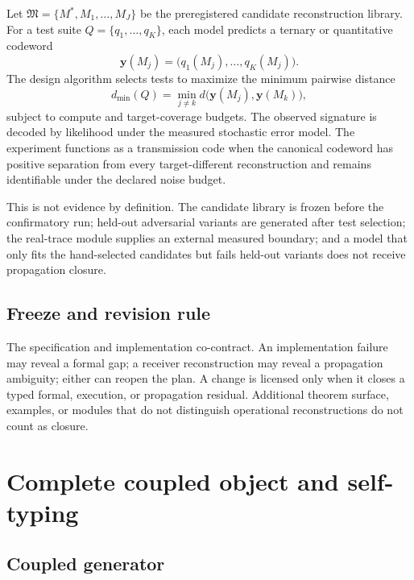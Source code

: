 \documentclass[11pt]{article}
\newcommand{\Codeword}{\mathbf y}
\begin{document}
Let $\mathfrak M=\{M^{\ast},M_1,\ldots,M_J\}$ be the preregistered candidate reconstruction library. For a test suite $Q=\{q_1,\ldots,q_K\}$, each model predicts a ternary or quantitative codeword
\begin{equation}
\Codeword(M_j)=\bigl(q_1(M_j),\ldots,q_K(M_j)\bigr).
\end{equation}
The design algorithm selects tests to maximize the minimum pairwise distance
\begin{equation}
d_{\min}(Q)=\min_{j\ne k}d\bigl(\Codeword(M_j),\Codeword(M_k)\bigr),
\end{equation}
subject to compute and target-coverage budgets. The observed signature is decoded by likelihood under the measured stochastic error model. The experiment functions as a transmission code when the canonical codeword has positive separation from every target-different reconstruction and remains identifiable under the declared noise budget.

This is not evidence by definition. The candidate library is frozen before the confirmatory run; held-out adversarial variants are generated after test selection; the real-trace module supplies an external measured boundary; and a model that only fits the hand-selected candidates but fails held-out variants does not receive propagation closure.

\subsection{Freeze and revision rule}

The specification and implementation co-contract. An implementation failure may reveal a formal gap; a receiver reconstruction may reveal a propagation ambiguity; either can reopen the plan. A change is licensed only when it closes a typed formal, execution, or propagation residual. Additional theorem surface, examples, or modules that do not distinguish operational reconstructions do not count as closure.
\section{Complete coupled object and self-typing}

\subsection{Coupled generator}
\end{document}
